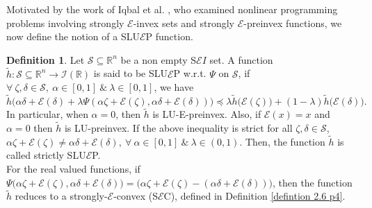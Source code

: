\documentclass[12pt, reqno]{amsart}
\theoremstyle{definition}
\newtheorem{definition}{Definition}[section]
\theoremstyle{remark}
\numberwithin{equation}{section}
\begin{document}
\noindent
Motivated by the work of Iqbal et al. \cite{Iqbal2022}, who examined nonlinear programming problems involving strongly $\mathcal{\mathcal{E}}$-invex sets and strongly $\mathcal{\mathcal{E}}$-preinvex functions, we now define the notion of a SLU$\mathcal{E}$P function.


  
 
      \begin{definition} \label{definition 3.1 p3}
      	Let ${\mathcal{S}}\subseteq { \mathbb{R}^{n}}$ be a non empty S$\mathcal{E}I$ set. A function $ \tilde{h}: {\mathcal{S}}\subseteq  \mathbb{R}^{n}\rightarrow  \mathcal{I}(\mathbb{R})$ is said to be SLU$\mathcal{E}$P w.r.t. ${\Psi}$ on ${\mathcal{S}}$, if $\forall~\mathit{\zeta} ,\mathit{\delta} \in  {\mathcal{S}},~{\alpha}\in {[0,1]}~\&~{\lambda} \in {[0,1]} $, we have
      	$$ \tilde{h}\big({\alpha}  \mathit{\delta} + {\mathcal{E}}( \mathit{\delta} )+ {\lambda} {\Psi}( {\alpha}  \mathit{\zeta} + {\mathcal{E}}( \mathit{\zeta} ), {\alpha}  \mathit{\delta} + {\mathcal{E}}( \mathit{\delta} ))\big)\preceq{\lambda}\tilde{h}\big({\mathcal{E}}( \mathit{\zeta} )\big)+(1- {\lambda})\tilde{h}\big({\mathcal{E}} (\mathit{\delta} )\big).$$ 
        In particular, when $\alpha=0$, then $\tilde{h}$ is LU-E-preinvex. Also, if $\mathcal E{(x)}=x$ and $\alpha=0$ then $\tilde{h}$ is LU-preinvex.
      	If the above inequality is strict for all $\mathit{\zeta} ,\mathit{\delta} \in  {\mathcal{S}}$,~$ {\alpha} \mathit{\zeta} + {\mathcal{E}}(\mathit{\zeta} )\neq  {\alpha} \mathit{\delta} + {\mathcal{E}} (\mathit{\delta} ),~\forall~  {\alpha}\in {[0,1]}~\&~{\lambda}\in {(0,1)}$. Then, the function $\tilde{h}$ is called strictly SLU$\mathcal{E}$P.\\
        
      	
      		\noindent
      For the real valued functions, if $\Psi\big(\alpha \mathit{\zeta} +\mathcal{E}(\mathit{\zeta} ),\alpha \mathit{\delta} +\mathcal{E} (\mathit{\delta} )\big)=\big(\alpha \mathit{\zeta} +\mathcal{E}(\mathit{\zeta} )-(\alpha \mathit{\delta} + \mathcal{E}(\mathit{\delta} ))\big)$, then the function $\tilde{h}$ reduces to a strongly-$\mathcal{E}$-convex (S$\mathcal{E}$C), defined in Definition \ref{defintion 2.6 p4}. 
      \end{definition}
    
\end{document}
